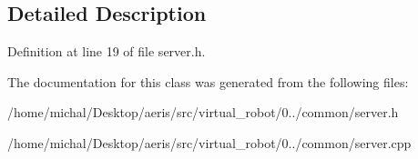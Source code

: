 \subsection{Detailed Description}


Definition at line 19 of file server.\-h.



The documentation for this class was generated from the following files\-:\begin{DoxyCompactItemize}
\item 
/home/michal/\-Desktop/aeris/src/virtual\-\_\-robot/0../common/server.\-h\item 
/home/michal/\-Desktop/aeris/src/virtual\-\_\-robot/0../common/server.\-cpp\end{DoxyCompactItemize}
